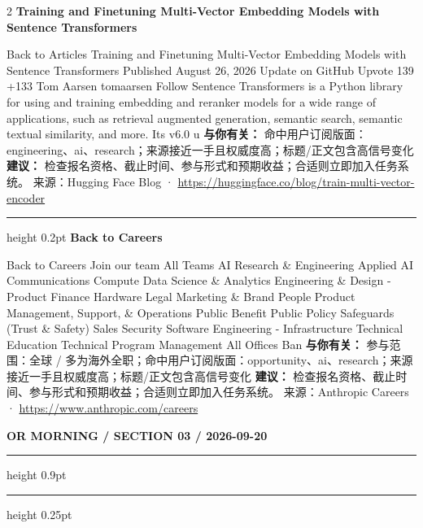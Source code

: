 \documentclass[10.5pt]{ctexart}
\begin{document}
\begin{multicols}{2}
{\large\bfseries Training and Finetuning Multi-Vector Embedding Models with Sentence Transformers}\par
Back to Articles Training and Finetuning Multi-Vector Embedding Models with Sentence Transformers Published August 26, 2026 Update on GitHub Upvote 139 +133 Tom Aarsen tomaarsen Follow Sentence Transformers is a Python library for using and training embedding and reranker models for a wide range of applications, such as retrieval augmented generation, semantic search, semantic textual similarity, and more. Its v6.0 u
\textbf{与你有关：} 命中用户订阅版面：engineering、ai、research；来源接近一手且权威度高；标题/正文包含高信号变化
\textbf{建议：} 检查报名资格、截止时间、参与形式和预期收益；合适则立即加入任务系统。
{\footnotesize\color{ormuted} 来源：Hugging Face Blog · \url{https://huggingface.co/blog/train-multi-vector-encoder}}
\vspace{2mm}
\hrule height 0.2pt
\vspace{2mm}
{\large\bfseries Back to Careers}\par
Back to Careers Join our team All Teams AI Research \& Engineering Applied AI Communications Compute Data Science \& Analytics Engineering \& Design - Product Finance Hardware Legal Marketing \& Brand People Product Management, Support, \& Operations Public Benefit Public Policy Safeguards (Trust \& Safety) Sales Security Software Engineering - Infrastructure Technical Education Technical Program Management All Offices Ban
\textbf{与你有关：} 参与范围：全球 / 多为海外全职；命中用户订阅版面：opportunity、ai、research；来源接近一手且权威度高；标题/正文包含高信号变化
\textbf{建议：} 检查报名资格、截止时间、参与形式和预期收益；合适则立即加入任务系统。
{\footnotesize\color{ormuted} 来源：Anthropic Careers · \url{https://www.anthropic.com/careers}}
\end{multicols}
\newpage
{\small\bfseries OR MORNING / SECTION 03 / 2026-09-20}
\vspace{2mm}
\hrule height 0.9pt
\vspace{1.5mm}
\hrule height 0.25pt
\vspace{4mm}
\end{document}
